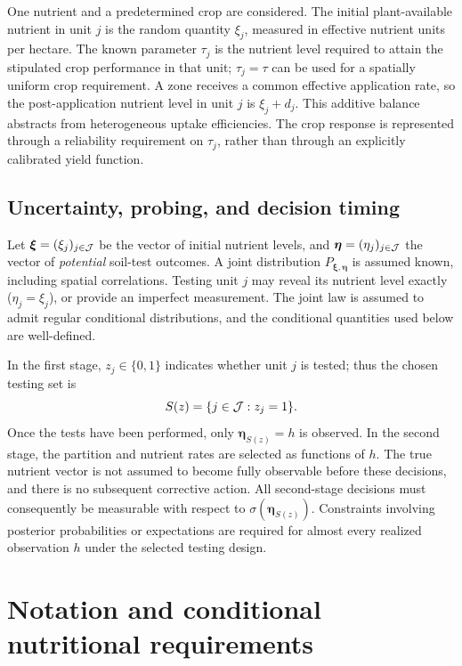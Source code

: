 One nutrient and a predetermined crop are considered. The initial
plant-available nutrient in unit $j$ is the random quantity $\xi_j$,
measured in effective nutrient units per hectare. The known parameter
$\tau_j$ is the nutrient level required to attain the stipulated crop
performance in that unit; $\tau_j=\tau$ can be used for a spatially
uniform crop requirement. A zone receives a common effective application
rate, so the post-application nutrient level in unit $j$ is $\xi_j+d_j$.
This additive balance abstracts from heterogeneous uptake efficiencies.
The crop response is represented through a reliability requirement on
$\tau_j$, rather than through an explicitly calibrated yield function.

\subsection{Uncertainty, probing, and decision timing}
\label{subsec:information}

Let $\boldsymbol{\xi}=(\xi_j)_{j\in\mathcal{J}}$ be the vector of initial nutrient
levels, and $\boldsymbol{\eta}=(\eta_j)_{j\in\mathcal{J}}$ the vector of
\emph{potential} soil-test outcomes. A joint distribution
$P_{\boldsymbol{\xi},\boldsymbol{\eta}}$ is assumed known, including
spatial correlations. Testing unit $j$ may reveal its nutrient level exactly
($\eta_j=\xi_j$), or provide an imperfect measurement. The joint law is
assumed to admit regular conditional distributions, and the conditional
quantities used below are well-defined.

In the first stage, $z_j\in\{0,1\}$ indicates whether unit $j$ is tested;
thus the chosen testing set is
\begin{equation}
 S(z)=\{j\in\mathcal{J}:z_j=1\}.
 \label{eq:selected-set}
\end{equation}
Once the tests have been performed, only
$\boldsymbol{\eta}_{S(z)}=h$ is observed. In the second stage, the
partition and nutrient rates are selected as functions of $h$.
The true nutrient vector is not assumed to become fully observable before
these decisions, and there is no subsequent corrective action. All
second-stage decisions must consequently be measurable with respect to
$\sigma(\boldsymbol{\eta}_{S(z)})$. Constraints involving posterior
probabilities or expectations are required for almost every realized
observation $h$ under the selected testing design.

\section{Notation and conditional nutritional requirements}
\label{sec:notation}

